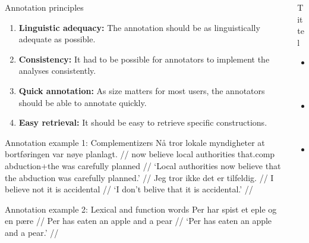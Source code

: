 \documentclass{ltgposter12}
\begin{document}
\begin{columns}[t]
\begin{column}{0.25\textwidth}
        \begin{block}{Annotation principles}
          \begin{enumerate}
           \item \textbf{Linguistic adequacy:} The annotation should be as linguistically adequate as possible.
           \item \textbf{Consistency:} It had to be possible for annotators to implement the analyses consistently.
           \item \textbf{Quick annotation:} As size matters for most users, the annotators should be able to annotate quickly.
           \item \textbf{Easy retrieval:} It should be easy to retrieve specific constructions.
          \end{enumerate}
        \end{block}
        \begin{block}{Annotation example 1: Complementizers}
            \ex\label{medat}\begingl
                \gla Nå tror lokale myndigheter at bortføringen var nøye planlagt. //
                \glb now believe local authorities that.comp abduction+the was carefully planned //
                \glft`Local authorities now believe that the abduction was carefully planned.' //
           \endgl\xe
            \ex\label{utenat}\begingl
                \gla Jeg tror ikke det er tilfeldig. //
                \glb I believe not it is accidental //
                \glft `I don't belive that it is accidental.' //
           \endgl\xe
        \end{block}
        \begin{block}{Annotation example 2: Lexical and function words}
            \ex\label{utenat}\begingl
                \gla Per har spist et eple og en pære //
                \glb Per has eaten an apple and a pear //
                \glft `Per has eaten an apple and a pear.' //
           \endgl\xe
        \end{block}

    \end{column}
    \begin{column}{0.5\textwidth}
        \begin{block}{Tittel}
            \begin{itemize}
                \item Foo
                \item Bar
                \item Blerg
            \end{itemize}
        \end{block}
    \end{column}
\end{columns}
\end{document}

